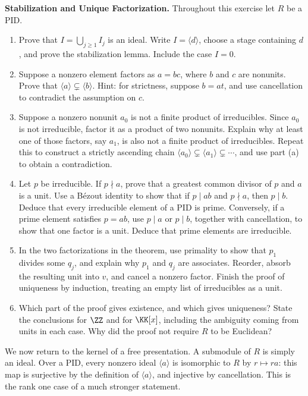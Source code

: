 \documentclass[12pt,reqno]{amsart}
\begin{document}
\begin{problems}
\item\label{s:factorization} \textbf{Stabilization and Unique Factorization.} Throughout this exercise let $R$ be a PID.
\begin{enumerate}
\item Prove that $I=\bigcup_{j\geq1}I_j$ is an ideal. Write $I=\langle d\rangle$, choose a stage containing $d$, and prove the stabilization lemma. Include the case $I=0$.
\item Suppose a nonzero element factors as $a=bc$, where $b$ and $c$ are nonunits. Prove that $\langle a\rangle\subsetneq\langle b\rangle$. Hint: for strictness, suppose $b=at$, and use cancellation to contradict the assumption on $c$.
\item Suppose a nonzero nonunit $a_0$ is not a finite product of irreducibles. Since $a_0$ is not irreducible, factor it as a product of two nonunits. Explain why at least one of those factors, say $a_1$, is also not a finite product of irreducibles. Repeat this to construct a strictly ascending chain $\langle a_0\rangle\subsetneq\langle a_1\rangle\subsetneq\cdots$, and use part (a) to obtain a contradiction.
\item Let $p$ be irreducible. If $p\nmid a$, prove that a greatest common divisor of $p$ and $a$ is a unit. Use a B\'ezout identity to show that if $p\mid ab$ and $p\nmid a$, then $p\mid b$. Deduce that every irreducible element of a PID is prime. Conversely, if a prime element satisfies $p=ab$, use $p\mid a$ or $p\mid b$, together with cancellation, to show that one factor is a unit. Deduce that prime elements are irreducible.
\item In the two factorizations in the theorem, use primality to show that $p_1$ divides some $q_j$, and explain why $p_1$ and $q_j$ are associates. Reorder, absorb the resulting unit into $v$, and cancel a nonzero factor. Finish the proof of uniqueness by induction, treating an empty list of irreducibles as a unit.
\item Which part of the proof gives existence, and which gives uniqueness? State the conclusions for $\ZZ$ and for $\KK[x]$, including the ambiguity coming from units in each case. Why did the proof not require $R$ to be Euclidean?
\end{enumerate}
\end{problems}

\hrulefill

We now return to the kernel of a free presentation. A submodule of $R$ is simply an ideal. Over a PID, every nonzero ideal $\langle a\rangle$ is isomorphic to $R$ by $r\mapsto ra$: this map is surjective by the definition of $\langle a\rangle$, and injective by cancellation. This is the rank one case of a much stronger statement.
\end{document}
